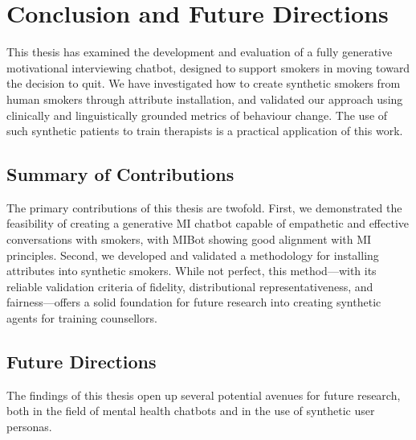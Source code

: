 \chapter{Conclusion and Future Directions}
\label{ch:conclusion}

This thesis has examined the development and evaluation of a fully generative motivational interviewing chatbot, designed to support smokers in moving toward the decision to quit. We have investigated how to create synthetic smokers from human smokers through attribute installation, and validated our approach using clinically and linguistically grounded metrics of behaviour change. The use of such synthetic patients to train therapists is a practical application of this work.


\section{Summary of Contributions}

The primary contributions of this thesis are twofold. First, we demonstrated the feasibility of creating a generative MI chatbot capable of empathetic and effective conversations with smokers, with MIBot showing good alignment with MI principles. Second, we developed and validated a methodology for installing attributes into synthetic smokers. While not perfect, this method---with its reliable validation criteria of fidelity, distributional representativeness, and fairness---offers a solid foundation for future research into creating synthetic agents for training counsellors.


\section{Future Directions}
The findings of this thesis open up several potential avenues for future research, both in the field of mental health chatbots and in the use of synthetic user personas.

